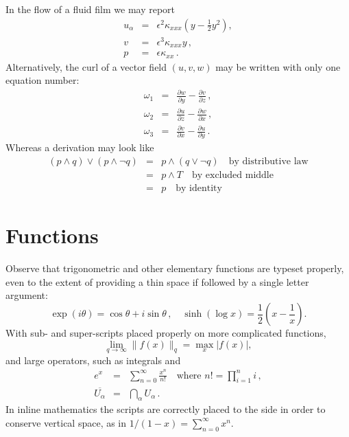 \documentclass[11pt,a4paper,oldfontcommands]{memoir}
\begin{document}
In the flow of a fluid film we may report
\begin{eqnarray}
  u_\alpha & = & \epsilon^2 \kappa_{xxx} 
  \left( y-\frac{1}{2}y^2 \right),
  \label{equ}  \\
  v & = & \epsilon^3 \kappa_{xxx} y\,,
  \label{eqv}  \\
  p & = & \epsilon \kappa_{xx}\,.
  \label{eqp}
\end{eqnarray}
Alternatively, the curl of a vector field $(u,v,w)$ may be written 
with only one equation number:
\begin{eqnarray}
  \omega_1 & = &
  \frac{\partial w}{\partial y}-\frac{\partial v}{\partial z}\,,
  \nonumber  \\
  \omega_2 & = & 
  \frac{\partial u}{\partial z}-\frac{\partial w}{\partial x}\,,
  \label{eqcurl}  \\
  \omega_3 & = & 
  \frac{\partial v}{\partial x}-\frac{\partial u}{\partial y}\,.
  \nonumber
\end{eqnarray}
Whereas a derivation may look like
\begin{eqnarray*}
  (p\wedge q)\vee(p\wedge\neg q) & = & p\wedge(q\vee\neg q)
  \quad\text{by distributive law}  \\
   & = & p\wedge T \quad\text{by excluded middle}  \\
   & = & p \quad\text{by identity}
\end{eqnarray*}






\section{Functions}

Observe that trigonometric and other elementary functions are typeset 
properly, even to the extent of providing a thin space if followed by 
a single letter argument:
\[
  \exp(i\theta)=\cos\theta +i\sin\theta\,,\quad
  \sinh(\log x)=\frac{1}{2}\left( x-\frac{1}{x} \right).
\]
With sub- and super-scripts placed properly on more complicated 
functions,
\[
  \lim_{q\to\infty}\|f(x)\|_q 
  =\max_{x}|f(x)|,
\]
and large operators, such as integrals and
\begin{eqnarray*}
  e^x & = & \sum_{n=0}^\infty \frac{x^n}{n!}
  \quad\text{where }n!=\prod_{i=1}^n i\,,  \\
  \overline{U_\alpha} & = & \bigcap_\alpha U_\alpha\,.
\end{eqnarray*}
In inline mathematics the scripts are correctly placed to the side in 
order to conserve vertical space, as in
\(
  1/(1-x)=\sum_{n=0}^\infty x^n.
\)
\end{document}
